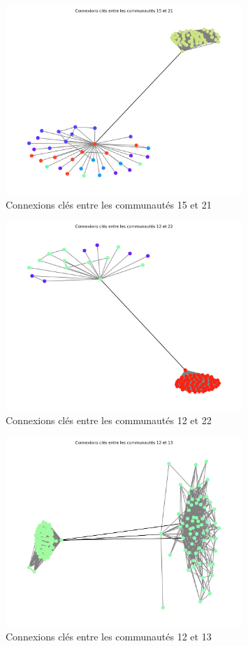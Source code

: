 \documentclass[a4paper, 12pt, twoside]{article}
\begin{document}
\begin{figure}[H]
    \centering
    \includegraphics[width=0.8\textwidth]{liaison_15_21.png}
    \caption{Connexions clés entre les communautés 15 et 21}
    \label{fig:liaison_15_21}
\end{figure}

\begin{figure}[H]
    \centering
    \includegraphics[width=0.8\textwidth]{liaison_12_22.png}
    \caption{Connexions clés entre les communautés 12 et 22}
    \label{fig:liaison_12_22}
\end{figure}

\begin{figure}[H]
    \centering
    \includegraphics[width=0.8\textwidth]{liaison_12_13.png}
    \caption{Connexions clés entre les communautés 12 et 13}
    \label{fig:liaison_12_13}
\end{figure}
\end{document}
